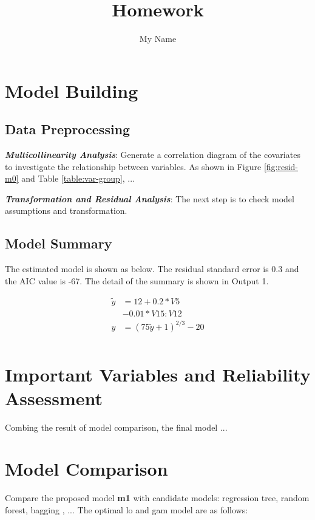 \documentclass[11pt a4paper]{article}
\begin{document}
\title{Homework}
\author{My Name}  %
\date{\vspace{-5ex}}  %
\maketitle

\section{Model Building}

\subsection{Data Preprocessing}

\textbf{\textit{Multicollinearity Analysis}}: Generate a correlation diagram of the covariates to investigate the relationship between variables. As shown in Figure \ref{fig:resid-m0} and Table   \ref{table:var-group}, ...


\textbf{\textit{Transformation and Residual Analysis}}: The next step is to check model assumptions and transformation.


\subsection{Model Summary}
The estimated model is shown as below. The residual standard error is 0.3 and the AIC value is -67. The detail of the summary is shown in Output 1.

\begin{equation}\nonumber
\begin{aligned}
\tilde{y} &=12 + 0.2*V5\\
&- 0.01*V15:V12 \\
y &= (75\tilde{y}+1)^{2/3}-20 \\
\end{aligned}
\end{equation}






\section{Important Variables and Reliability Assessment}
Combing the result of model comparison, the final model ...


\section{Model Comparison}
Compare the proposed model \textbf{m1} with candidate models: regression tree, random forest, bagging \cite{faraway2016extending} , ... The optimal lo and gam model are as follows:

\end{document}
